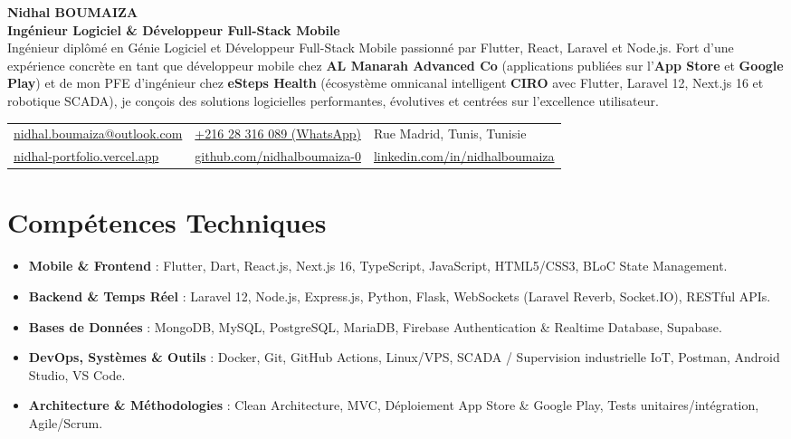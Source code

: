 \documentclass[10pt,a4paper]{article}
\begin{document}
{\Huge \textbf{\color{primarydark}Nidhal BOUMAIZA}}\\[4pt]
{\Large \textbf{\color{accent}Ingénieur Logiciel \& Développeur Full-Stack Mobile}}\\[6pt]
{\small\color{textgray}
Ingénieur diplômé en Génie Logiciel et Développeur Full-Stack Mobile passionné par Flutter, React, Laravel et Node.js. Fort d'une expérience concrète en tant que développeur mobile chez \textbf{AL Manarah Advanced Co} (applications publiées sur l'\textbf{App Store} et \textbf{Google Play}) et de mon PFE d'ingénieur chez \textbf{eSteps Health} (écosystème omnicanal intelligent \textbf{CIRO} avec Flutter, Laravel 12, Next.js 16 et robotique SCADA), je conçois des solutions logicielles performantes, évolutives et centrées sur l'excellence utilisateur.
}

\vspace{6pt}
\begin{tabularx}{\textwidth}{@{}X X X@{}}
\href{mailto:nidhal.boumaiza@outlook.com}{nidhal.boumaiza@outlook.com} & \href{https://wa.me/21628316089}{+216 28 316 089 (WhatsApp)} & Rue Madrid, Tunis, Tunisie \\
\href{https://nidhal-portfolio.vercel.app/}{nidhal-portfolio.vercel.app} & \href{https://github.com/nidhalboumaiza-0}{github.com/nidhalboumaiza-0} & \href{https://linkedin.com/in/nidhalboumaiza}{linkedin.com/in/nidhalboumaiza}
\end{tabularx}

\vspace{3pt}
\section{Compétences Techniques}
\begin{itemize}
  \item \textbf{Mobile \& Frontend} : Flutter, Dart, React.js, Next.js 16, TypeScript, JavaScript, HTML5/CSS3, BLoC State Management.
  \item \textbf{Backend \& Temps Réel} : Laravel 12, Node.js, Express.js, Python, Flask, WebSockets (Laravel Reverb, Socket.IO), RESTful APIs.
  \item \textbf{Bases de Données} : MongoDB, MySQL, PostgreSQL, MariaDB, Firebase Authentication \& Realtime Database, Supabase.
  \item \textbf{DevOps, Systèmes \& Outils} : Docker, Git, GitHub Actions, Linux/VPS, SCADA / Supervision industrielle IoT, Postman, Android Studio, VS Code.
  \item \textbf{Architecture \& Méthodologies} : Clean Architecture, MVC, Déploiement App Store \& Google Play, Tests unitaires/intégration, Agile/Scrum.
\end{itemize}
\end{document}
